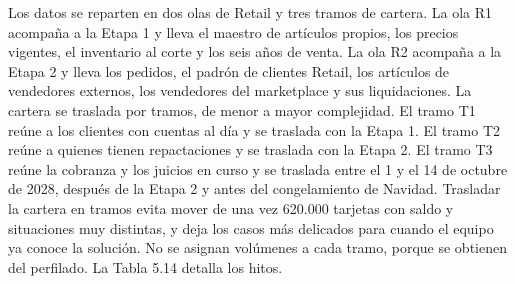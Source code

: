 \documentclass[11pt]{article}
\begin{document}
Los datos se reparten en dos olas de Retail y tres tramos de cartera. La ola R1 acompaña a la Etapa 1 y lleva el maestro de artículos propios, los precios vigentes, el inventario al corte y los seis años de venta. La ola R2 acompaña a la Etapa 2 y lleva los pedidos, el padrón de clientes Retail, los artículos de vendedores externos, los vendedores del marketplace y sus liquidaciones. La cartera se traslada por tramos, de menor a mayor complejidad. El tramo T1 reúne a los clientes con cuentas al día y se traslada con la Etapa 1. El tramo T2 reúne a quienes tienen repactaciones y se traslada con la Etapa 2. El tramo T3 reúne la cobranza y los juicios en curso y se traslada entre el 1 y el 14 de octubre de 2028, después de la Etapa 2 y antes del congelamiento de Navidad. Trasladar la cartera en tramos evita mover de una vez 620.000 tarjetas con saldo y situaciones muy distintas, y deja los casos más delicados para cuando el equipo ya conoce la solución. No se asignan volúmenes a cada tramo, porque se obtienen del perfilado. La Tabla 5.14 detalla los hitos.
\end{document}

